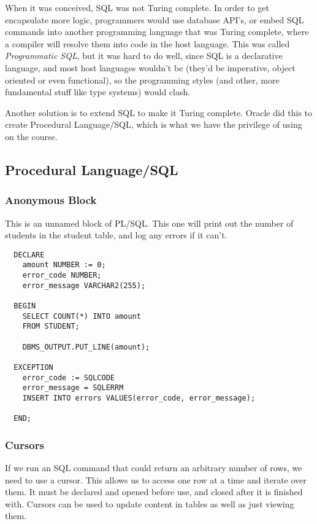 When it was conceived, SQL was not Turing complete. In order to get encapsulate
more logic, programmers would use database API's, or embed SQL commands into
another programming language that was Turing complete, where a compiler will
resolve them into code in the host language. This was called
\textit{Programmatic SQL}, but it was hard to do well, since SQL is a
declarative language, and most host languages wouldn't be (they'd be imperative,
object oriented or even functional), so the programming styles (and other, more
fundamental stuff like type systems) would clash.

Another solution is to extend SQL to make it Turing complete. Oracle did this to
create Procedural Language/SQL, which is what we have the privilege of using on
the course.

\subsection{Procedural Language/SQL}

\subsubsection{Anonymous Block}

This is an unnamed block of PL/SQL. This one will print out the number of
students in the student table, and log any errors if it can't.

\begin{verbatim}
  DECLARE
    amount NUMBER := 0;
    error_code NUMBER;
    error_message VARCHAR2(255);

  BEGIN
    SELECT COUNT(*) INTO amount
    FROM STUDENT;

    DBMS_OUTPUT.PUT_LINE(amount);

  EXCEPTION
    error_code := SQLCODE
    error_message = SQLERRM
    INSERT INTO errors VALUES(error_code, error_message);

  END;
\end{verbatim}

\subsubsection{Cursors}

If we run an SQL command that could return an arbitrary number of rows, we need
to use a cursor. This allows us to access one row at a time and iterate over
them. It must be declared and opened before use, and closed
after it is finished with. Cursors can be used to update content in tables as
well as just viewing them.

